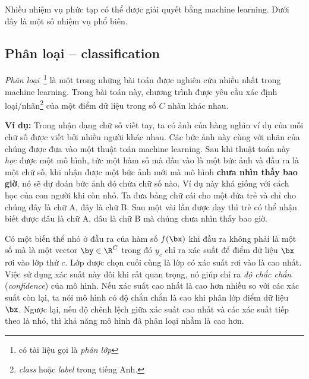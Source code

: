 Nhiều nhiệm vụ phức tạp có thể được giải quyết bằng machine learning. Dưới đây
là một số nhiệm vụ phổ biến.


\subsection{Phân loại -- classification}
\textit{Phân loại}~\footnote{có tài liệu gọi là \textit{phân lớp}} là một
trong những bài toán được nghiên cứu nhiều nhất trong machine learning. Trong
bài toán này, chương trình được yêu cầu xác định loại/nhãn\footnote{\textit{class} hoặc \textit{label} trong tiếng Anh.} của một điểm dữ liệu trong số $C$ nhãn khác nhau.



\textbf{Ví dụ:} Trong nhận dạng chữ số viết tay, ta có ảnh của hàng nghìn ví
dụ của mỗi chữ số được viết bởi nhiều người khác nhau. Các bức ảnh này cùng với
nhãn của chúng được đưa vào một thuật toán machine learning. Sau khi thuật toán
này \textit{học} được một mô hình, tức một hàm số mà đầu vào là một bức ảnh và
đầu ra là một chữ số, khi nhận được một bức ảnh mới mà mô hình \textbf{chưa nhìn
thấy bao giờ}, nó sẽ dự đoán bức ảnh đó chứa chữ số nào.
Ví dụ này khá giống với cách học của con người khi còn nhỏ. Ta đưa bảng chữ cái
cho một đứa trẻ và chỉ cho chúng đây là chữ A, đây là chữ B. Sau một vài lần
được dạy thì trẻ có thể nhận biết được đâu là chữ A, đâu là chữ B mà chúng chưa nhìn thấy bao giờ.

Có một biến thể nhỏ ở đầu ra của hàm số $f(\bx)$ khi đầu ra không phải là một số
mà là một vector $\by \in \R^C$ trong đó $y_c$ chỉ ra xác suất để điểm dữ liệu
$\bx$ rơi vào lớp thứ $c$. Lớp được chọn cuối cùng là lớp có xác suất rơi vào là
cao nhất. Việc sử dụng xác suất này đôi khi rất quan trọng, nó giúp chỉ ra
\textit{độ chắc chắn} (\textit{confidence}) của mô hình. Nếu xác suất cao nhất
là cao hơn nhiều so với các xác suất còn lại, ta nói mô hình có độ chắn chắn là
cao khi phân lớp điểm dữ liệu $\bx$. Ngược lại, nếu độ chênh lệch giữa xác suất
cao nhất và các xác suất tiếp theo là nhỏ, thì khả năng mô hình đã phân loại
nhầm là cao hơn.

